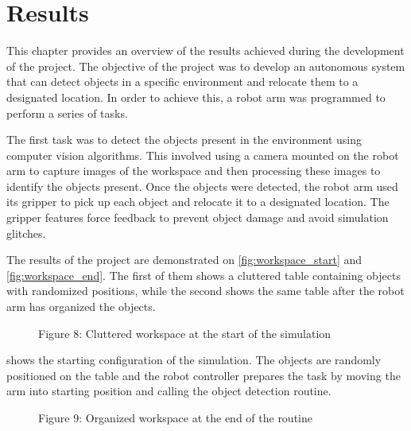 
\chapter{Results} %
\label{results} %



This chapter provides an overview of the results achieved during the development of the project. The objective of the project was to develop an autonomous system that can detect objects in a specific environment and relocate them to a designated location. In order to achieve this, a robot arm was programmed to perform a series of tasks. 

The first task was to detect the objects present in the environment using computer vision algorithms. This involved using a camera mounted on the robot arm to capture images of the workspace and then processing these images to identify the objects present. Once the objects were detected, the robot arm used its gripper to pick up each object and relocate it to a designated location. The gripper features force feedback to prevent object damage and avoid simulation glitches.

The results of the project are demonstrated on \vref{fig:workspace_start} and \vref{fig:workspace_end}. The first of them shows a cluttered table containing objects with randomized positions, while the second shows the same table after the robot arm has organized the objects.

\begin{figure}[!h]
    \centering
    \caption{Figure 8: Cluttered workspace at the start of the simulation }
    \label{fig:workspace_start}
\end{figure}

 shows the starting configuration of the simulation. The objects are randomly positioned on the table and the robot controller prepares the task by moving the arm into starting position and calling the object detection routine.

\begin{figure}[!h]
    \centering
    \caption{Figure 9: Organized workspace at the end of the routine }
    \label{fig:workspace_end}
\end{figure}

